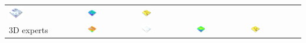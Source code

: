 \documentclass[Afour,sageh,times]{sagej}
\begin{document}
\begin{table}[h]
\begin{tabular}{m{} m{} m{} m{} m{}}
\includegraphics[width=0.2\textwidth]{images/render_3d/3d_novices/stdev_regression_difference_series_4.png} &
\includegraphics[width=0.2\textwidth]{images/render_3d/3d_novices/mean_slope_4.png} &
\includegraphics[width=0.2\textwidth]{images/render_3d/3d_novices/mean_forms_4.png}\\
%
3D experts & 
\includegraphics[width=0.2\textwidth]{images/render_3d/3d_experts/mean_dem_4.png} &
\includegraphics[width=0.2\textwidth]{images/render_3d/3d_experts/stdev_regression_difference_series_4.png} &
\includegraphics[width=0.2\textwidth]{images/render_3d/3d_experts/mean_slope_4.png} &
\includegraphics[width=0.2\textwidth]{images/render_3d/3d_experts/mean_forms_4.png}\\

\end{tabular}
\end{table}
\end{document}
